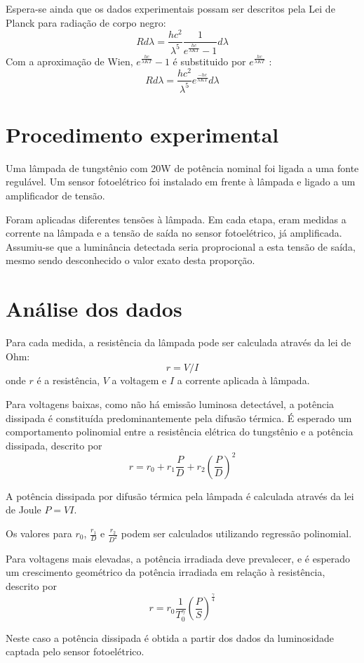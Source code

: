 \documentclass[brazilian,12pt,a4paper,final]{article}
\begin{document}
Espera-se ainda que os dados experimentais possam ser descritos pela Lei de Planck
para radiação de corpo negro:
\[
R d\lambda=\frac{hc^2}{\lambda^5}\frac{1}{e^\frac{hc}{\lambda KT}-1} d\lambda
\]
Com a aproximação de Wien, $e^\frac{hc}{\lambda KT}-1$ é substituido 
por $e^\frac{hc}{\lambda KT}$ :
\[
R d\lambda=\frac{hc^2}{\lambda^5}e^\frac{-hc}{\lambda KT} d\lambda
\]

\section{Procedimento experimental}
Uma lâmpada de tungstênio com 20W de potência nominal foi ligada a uma fonte regulável. 
Um sensor fotoelétrico foi instalado em frente à lâmpada e ligado a um amplificador de tensão.

Foram aplicadas diferentes tensões à lâmpada.
Em cada etapa, eram medidas a corrente na lâmpada e a tensão de saída no sensor fotoelétrico, já amplificada.
Assumiu-se que a luminância detectada seria proprocional a esta tensão de saída, mesmo sendo desconhecido o valor exato desta proporção.

\section{Análise dos dados}
Para cada medida, 
a resistência da lâmpada pode ser calculada 
através da lei de Ohm: 
$$ r=V/I$$ 
onde $r$ é a resistência, $V$ a voltagem e $I$ a corrente aplicada à lâmpada. 

Para voltagens baixas,
como não há emissão luminosa detectável, 
a potência dissipada é constituída predominantemente
pela difusão térmica.
É esperado um comportamento polinomial entre a 
resistência elétrica do tungstênio e a potência dissipada, descrito por
$$r=r_0+r_1\frac{P}{D}+r_2(\frac{P}{D})^2$$

A potência dissipada por difusão térmica pela lâmpada é calculada através da 
lei de Joule $ P=VI $.

Os valores para $r_0$, $\frac{r_1}{D}$ e $\frac{r_2}{D^2}$
podem ser calculados
utilizando regressão polinomial.

Para voltagens mais elevadas, 
a potência irradiada deve prevalecer, e
é esperado um crescimento geométrico da 
potência irradiada em relação à resistência, descrito por
$$r=r_0\frac{1}{T_0^\gamma}(\frac{P}{S})^\frac{\gamma}{4}$$

Neste caso a potência dissipada é obtida a partir dos dados da luminosidade captada
pelo sensor fotoelétrico.
\end{document}
